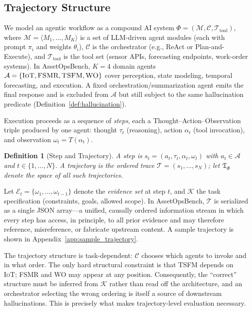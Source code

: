 \documentclass{article}
\newtheorem{definition}{Definition}
\begin{document}
\subsection{Trajectory Structure}
\label{sec:trajectory_structure}

We model an agentic workflow as a compound AI system $\Phi = (\mathcal{M}, \mathcal{C}, \mathcal{T}_{\text{tool}})$, where $\mathcal{M} = \langle M_1, \dots, M_K \rangle$ is a set of LLM-driven agent modules (each with prompt $\pi_i$ and weights $\theta_i$), $\mathcal{C}$ is the orchestrator (e.g., ReAct or Plan-and-Execute), and $\mathcal{T}_{\text{tool}}$ is the tool set (sensor APIs, forecasting endpoints, work-order systems). In AssetOpsBench, $K=4$ domain agents $\mathcal{A} = \{\textsc{IoT}, \textsc{FSMR}, \textsc{TSFM}, \textsc{WO}\}$ cover perception, state modeling, temporal forecasting, and execution. A fixed orchestration/summarization agent emits the final response and is excluded from $\mathcal{A}$ but still subject to the same hallucination predicate (Definition~\ref{def:hallucination}).

Execution proceeds as a sequence of \emph{steps}, each a Thought--Action--Observation triple produced by one agent: thought $\tau_t$ (reasoning), action $\alpha_t$ (tool invocation), and observation $\omega_t = T(\alpha_t)$.

\begin{definition}[Step and Trajectory]
A \emph{step} is $s_t = (a_t, \tau_t, \alpha_t, \omega_t)$ with $a_t \in \mathcal{A}$ and $t \in \{1,\dots,N\}$. A \emph{trajectory} is the ordered trace $\mathcal{T} = (s_1, \dots, s_N)$; let $\mathfrak{T}_\Phi$ denote the space of all such trajectories.
\end{definition}

Let $\mathcal{E}_t = \{\omega_1, \dots, \omega_{t-1}\}$ denote the \emph{evidence set} at step $t$, and $\mathcal{K}$ the task specification (constraints, goals, allowed scope). In AssetOpsBench, $\mathcal{T}$ is serialized as a single JSON array---a unified, causally ordered information stream in which every step has access, in principle, to all prior evidence and may therefore reference, misreference, or fabricate upstream content. A sample trajectory is shown in Appendix~\ref{app:sample_trajectory}.

The trajectory structure is task-dependent: $\mathcal{C}$ chooses which agents to invoke and in what order. The only hard structural constraint is that \textsc{TSFM} depends on \textsc{IoT}; \textsc{FSMR} and \textsc{WO} may appear at any position. Consequently, the ``correct'' structure must be inferred from $\mathcal{K}$ rather than read off the architecture, and an orchestrator selecting the wrong ordering is itself a source of downstream hallucinations. This is precisely what makes trajectory-level evaluation necessary.
\end{document}
